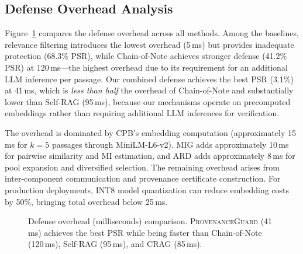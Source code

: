 \documentclass[journal,10pt]{IEEEtran}
\begin{document}
\subsection{Defense Overhead Analysis}

Figure~\ref{fig:overhead} compares the defense overhead across all methods. Among the baselines, relevance filtering introduces the lowest overhead (5\,ms) but provides inadequate protection (68.3\% PSR), while Chain-of-Note achieves stronger defense (41.2\% PSR) at 120\,ms---the highest overhead due to its requirement for an additional LLM inference per passage. Our combined defense achieves the best PSR (3.1\%) at 41\,ms, which is \emph{less than half} the overhead of Chain-of-Note and substantially lower than Self-RAG (95\,ms), because our mechanisms operate on precomputed embeddings rather than requiring additional LLM inferences for verification.

The overhead is dominated by CPB's embedding computation (approximately 15\,ms for $k=5$ passages through MiniLM-L6-v2). MIG adds approximately 10\,ms for pairwise similarity and MI estimation, and ARD adds approximately 8\,ms for pool expansion and diversified selection. The remaining overhead arises from inter-component communication and provenance certificate construction. For production deployments, INT8 model quantization can reduce embedding costs by 50\%, bringing total overhead below 25\,ms.

\begin{figure}[t]
\centering
{}
\caption{Defense overhead (milliseconds) comparison. \textsc{ProvenanceGuard} (41\,ms) achieves the best PSR while being faster than Chain-of-Note (120\,ms), Self-RAG (95\,ms), and CRAG (85\,ms).}
\label{fig:overhead}
\end{figure}
\end{document}
